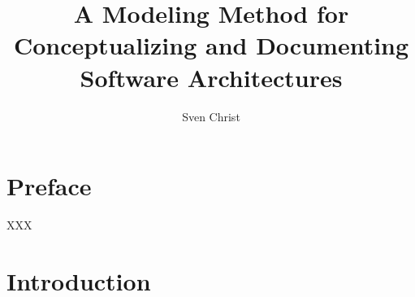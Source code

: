 \documentclass[
  draft=false,
  paper=a4,
  fontsize=12pt,
  pagesize=auto,
  twoside=false,
  headings=small,openany,
  chapterprefix=false,
  version=last,
  titlepage=true,
  parskip=half+,
  mpinclude=false,
  headsepline=true,
  toc=bibliography,
  toc=index,
  numbers=noendperiod
]{scrbook}
\begin{document}
\title{A Modeling Method for \\ Conceptualizing and Documenting \\ Software Architectures}
\subtitle{}
\author{Sven Christ}
\date{}

\maketitle

\pagestyle{empty}

\chapter*{Preface}
\thispagestyle{empty}

XXX

\tableofcontents

\newpage



\setcounter{page}{1}
\pagestyle{plain}




\chapter{Introduction}




\printbibliography
\end{document}
